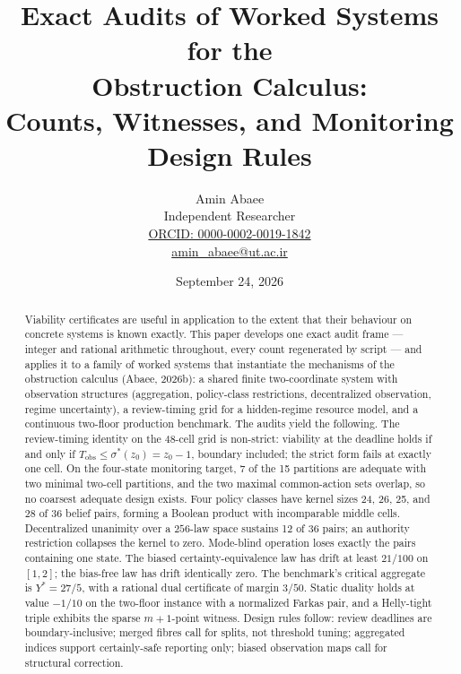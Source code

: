 \documentclass[10pt,twocolumn]{article}
\theoremstyle{definition}
\begin{document}
\title{Exact Audits of Worked Systems for the\\ Obstruction Calculus:\\ Counts, Witnesses, and Monitoring Design Rules}
\author{Amin Abaee\\[0.35em]
{\small Independent Researcher}\\[0.55em]
{\small\href{https://orcid.org/0000-0002-0019-1842}{ORCID: 0000-0002-0019-1842}}\\[0.3em]
{\small\href{mailto:amin\_abaee@ut.ac.ir}{amin\_abaee@ut.ac.ir}}}
\date{September 24, 2026}
\maketitle

\begin{abstract}
Viability certificates are useful in application to the extent that their
behaviour on concrete systems is known exactly. This paper develops one
exact audit frame --- integer and rational arithmetic throughout, every
count regenerated by script --- and applies it to a family of worked
systems that instantiate the mechanisms of the obstruction calculus
(Abaee, 2026b): a shared finite two-coordinate system with observation
structures (aggregation, policy-class restrictions, decentralized
observation, regime uncertainty), a review-timing grid for a
hidden-regime resource model, and a continuous two-floor production
benchmark. The audits yield the following. The review-timing identity on
the 48-cell grid is non-strict: viability at the deadline holds if and
only if \(T_{\mathrm{obs}} \le \sigma^{*}(z_0) = z_0 - 1\), boundary
included; the strict form fails at exactly one cell. On the four-state
monitoring target, 7 of the 15 partitions are adequate with two minimal
two-cell partitions, and the two maximal common-action sets overlap, so
no coarsest adequate design exists. Four policy classes have kernel
sizes 24, 26, 25, and 28 of 36 belief pairs, forming a Boolean product
with incomparable middle cells. Decentralized unanimity over a
\(256\)-law space sustains 12 of 36 pairs; an authority restriction
collapses the kernel to zero. Mode-blind operation loses exactly the
pairs containing one state. The biased certainty-equivalence law has
drift at least \(21/100\) on \([1,2]\); the bias-free law has drift
identically zero. The benchmark's critical aggregate is \(Y^{*} = 27/5\),
with a rational dual certificate of margin \(3/50\). Static duality
holds at value \(-1/10\) on the two-floor instance with a normalized
Farkas pair, and a Helly-tight triple exhibits the sparse \(m{+}1\)-point
witness. Design rules follow: review deadlines are boundary-inclusive;
merged fibres call for splits, not threshold tuning; aggregated indices
support certainly-safe reporting only; biased observation maps call for
structural correction.
\end{abstract}
\end{document}
